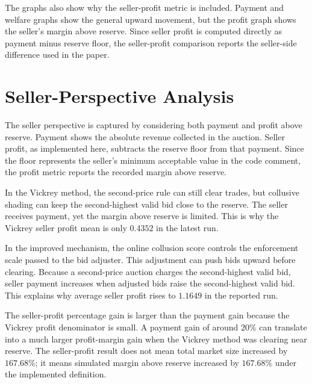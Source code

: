\documentclass[conference]{IEEEtran}
\begin{document}
The graphs also show why the seller-profit metric is included. Payment and welfare graphs show the general upward movement, but the profit graph shows the seller's margin above reserve. Since seller profit is computed directly as payment minus reserve floor, the seller-profit comparison reports the seller-side difference used in the paper.

\FloatBarrier

\section{Seller-Perspective Analysis}
The seller perspective is captured by considering both payment and profit above reserve. Payment shows the absolute revenue collected in the auction. Seller profit, as implemented here, subtracts the reserve floor from that payment. Since the floor represents the seller's minimum acceptable value in the code comment, the profit metric reports the recorded margin above reserve.

In the Vickrey method, the second-price rule can still clear trades, but collusive shading can keep the second-highest valid bid close to the reserve. The seller receives payment, yet the margin above reserve is limited. This is why the Vickrey seller profit mean is only $0.4352$ in the latest run.

In the improved mechanism, the online collusion score controls the enforcement scale passed to the bid adjuster. This adjustment can push bids upward before clearing. Because a second-price auction charges the second-highest valid bid, seller payment increases when adjusted bids raise the second-highest valid bid. This explains why average seller profit rises to $1.1649$ in the reported run.

The seller-profit percentage gain is larger than the payment gain because the Vickrey profit denominator is small. A payment gain of around $20\%$ can translate into a much larger profit-margin gain when the Vickrey method was clearing near reserve. The seller-profit result does not mean total market size increased by $167.68\%$; it means simulated margin above reserve increased by $167.68\%$ under the implemented definition.
\end{document}
